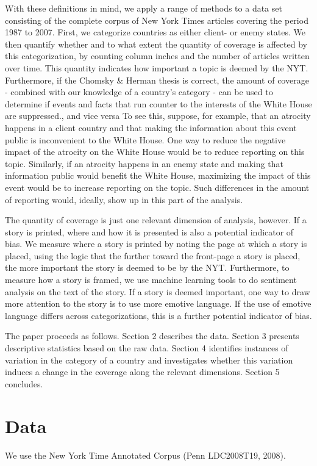 	With these definitions in mind, we apply a range of methods to a data set consisting of the complete corpus of New York Times articles covering the period 1987 to 2007. First, we categorize countries as either client- or enemy states. We then quantify whether and to what extent the quantity of coverage is affected by this categorization, by counting column inches and the number of articles written over time. 
	This quantity indicates how important a topic is deemed by the NYT. Furthermore, if the Chomsky \& Herman thesis is correct, the amount of coverage - combined with our knowledge of a country's category - can be used to determine if events and facts that run counter to the interests of the White House are suppressed., and vice versa  To see this, suppose, for example, that an atrocity happens in a client country and that making the information about this event public is inconvenient to the White House. One way to reduce the negative impact of the atrocity on the White House would be to reduce reporting on this topic. Similarly, if an atrocity happens in an enemy state and making that information public would benefit the White House, maximizing the impact of this event would be to increase reporting on the topic. Such differences in the amount of reporting would, ideally, show up in this part of the analysis. 
	
	The quantity of coverage is just one relevant dimension of analysis, however. If a story is printed, where and how it is presented is also a potential indicator of bias. We measure where a story is printed by noting the page at which a story is placed, using the logic that the further toward the front-page a story is placed, the more important the story is deemed to be by the NYT. Furthermore, to measure how a story is framed, we use machine learning tools to do sentiment analysis on the text of the story. If a story is deemed important, one way to draw more attention to the story is to use more emotive language. If the use of emotive language differs across categorizations, this is a further potential indicator of bias.
	
	The paper proceeds as follows.  Section 2 describes the data. Section 3 presents descriptive statistics based on the raw data. Section 4 identifies instances of variation in the category of a country and investigates whether this variation induces a change in the coverage along the relevant dimensions. Section 5 concludes. 
	
	\section{Data}
	We use the New York Time Annotated Corpus (Penn LDC2008T19,  2008).
	
